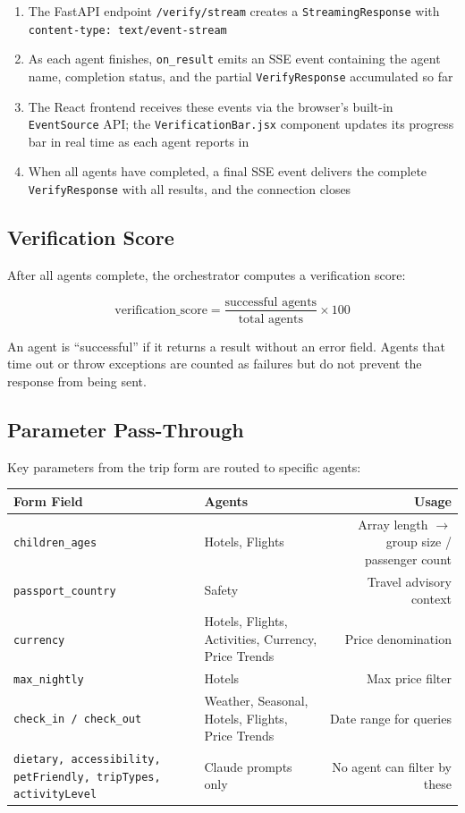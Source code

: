 \documentclass[11pt,a4paper]{article}
\begin{document}
\begin{enumerate}[nosep]
\item The FastAPI endpoint \texttt{/verify/stream} creates a \texttt{StreamingResponse} with \texttt{content-type: text/event-stream}
\item As each agent finishes, \texttt{on\_result} emits an SSE event containing the agent name, completion status, and the partial \texttt{VerifyResponse} accumulated so far
\item The React frontend receives these events via the browser's built-in \texttt{EventSource} API; the \texttt{VerificationBar.jsx} component updates its progress bar in real time as each agent reports in
\item When all agents have completed, a final SSE event delivers the complete \texttt{VerifyResponse} with all results, and the connection closes
\end{enumerate}

\subsection{Verification Score}

After all agents complete, the orchestrator computes a verification score:

$$\text{verification\_score} = \frac{\text{successful agents}}{\text{total agents}} \times 100$$

An agent is ``successful'' if it returns a result without an error field. Agents that time out or throw exceptions are counted as failures but do not prevent the response from being sent.

\subsection{Parameter Pass-Through}

Key parameters from the trip form are routed to specific agents:

{\small
\begin{tabularx}{\textwidth}{@{}L{3.4cm}L{3.4cm}R@{}}
\toprule
\textbf{Form Field} & \textbf{Agents} & \textbf{Usage} \\
\midrule
\texttt{children\_ages} & Hotels, Flights & Array length $\to$ group size / passenger count \\[3pt]
\texttt{passport\_country} & Safety & Travel advisory context \\[3pt]
\texttt{currency} & Hotels, Flights, Activities, Currency, Price Trends & Price denomination \\[3pt]
\texttt{max\_nightly} & Hotels & Max price filter \\[3pt]
\texttt{check\_in / check\_out} & Weather, Seasonal, Hotels, Flights, Price Trends & Date range for queries \\[3pt]
\texttt{dietary, accessibility, petFriendly, tripTypes, activityLevel} & Claude prompts only & No agent can filter by these \\
\bottomrule
\end{tabularx}}
\end{document}
